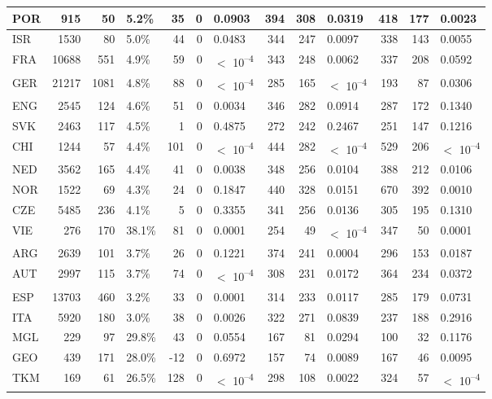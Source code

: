 \begin{tabular}{l|r|r|l|r|r|l|r|r|l|r|r|l}
\hline
POR & 915 & 50 & 5.2\% & 35 & 0 & 0.0903 & 394 & 308 & 0.0319 & 418 & 177 & 0.0023\\
\hline
ISR & 1530 & 80 & 5.0\% & 44 & 0 & 0.0483 & 344 & 247 & 0.0097 & 338 & 143 & 0.0055\\
\hline
FRA & 10688 & 551 & 4.9\% & 59 & 0 & $<$ 10\textsuperscript{--4} & 343 & 248 & 0.0062 & 337 & 208 & 0.0592\\
\hline
GER & 21217 & 1081 & 4.8\% & 88 & 0 & $<$ 10\textsuperscript{--4} & 285 & 165 & $<$ 10\textsuperscript{--4} & 193 & 87 & 0.0306\\
\hline
ENG & 2545 & 124 & 4.6\% & 51 & 0 & 0.0034 & 346 & 282 & 0.0914 & 287 & 172 & 0.1340\\
\hline
SVK & 2463 & 117 & 4.5\% & 1 & 0 & 0.4875 & 272 & 242 & 0.2467 & 251 & 147 & 0.1216\\
\hline
CHI & 1244 & 57 & 4.4\% & 101 & 0 & $<$ 10\textsuperscript{--4} & 444 & 282 & $<$ 10\textsuperscript{--4} & 529 & 206 & $<$ 10\textsuperscript{--4}\\
\hline
NED & 3562 & 165 & 4.4\% & 41 & 0 & 0.0038 & 348 & 256 & 0.0104 & 388 & 212 & 0.0106\\
\hline
NOR & 1522 & 69 & 4.3\% & 24 & 0 & 0.1847 & 440 & 328 & 0.0151 & 670 & 392 & 0.0010\\
\hline
CZE & 5485 & 236 & 4.1\% & 5 & 0 & 0.3355 & 341 & 256 & 0.0136 & 305 & 195 & 0.1310\\
\hline
VIE & 276 & 170 & 38.1\% & 81 & 0 & 0.0001 & 254 & 49 & $<$ 10\textsuperscript{--4} & 347 & 50 & 0.0001\\
\hline
ARG & 2639 & 101 & 3.7\% & 26 & 0 & 0.1221 & 374 & 241 & 0.0004 & 296 & 153 & 0.0187\\
\hline
AUT & 2997 & 115 & 3.7\% & 74 & 0 & $<$ 10\textsuperscript{--4} & 308 & 231 & 0.0172 & 364 & 234 & 0.0372\\
\hline
ESP & 13703 & 460 & 3.2\% & 33 & 0 & 0.0001 & 314 & 233 & 0.0117 & 285 & 179 & 0.0731\\
\hline
ITA & 5920 & 180 & 3.0\% & 38 & 0 & 0.0026 & 322 & 271 & 0.0839 & 237 & 188 & 0.2916\\
\hline
MGL & 229 & 97 & 29.8\% & 43 & 0 & 0.0554 & 167 & 81 & 0.0294 & 100 & 32 & 0.1176\\
\hline
GEO & 439 & 171 & 28.0\% & -12 & 0 & 0.6972 & 157 & 74 & 0.0089 & 167 & 46 & 0.0095\\
\hline
TKM & 169 & 61 & 26.5\% & 128 & 0 & $<$ 10\textsuperscript{--4} & 298 & 108 & 0.0022 & 324 & 57 & $<$ 10\textsuperscript{--4}\\

\end{tabular}
